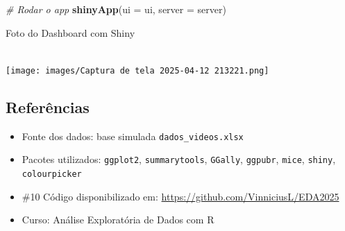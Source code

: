 \documentclass[
]{article}
\newenvironment{Shaded}{\begin{snugshade}}{\end{snugshade}}
\newcommand{\AttributeTok}[1]{\textcolor[rgb]{0.13,0.29,0.53}{#1}}
\newcommand{\CommentTok}[1]{\textcolor[rgb]{0.56,0.35,0.01}{\textit{#1}}}
\newcommand{\FunctionTok}[1]{\textcolor[rgb]{0.13,0.29,0.53}{\textbf{#1}}}
\newcommand{\NormalTok}[1]{#1}
\providecommand{\tightlist}{%
  \setlength{\itemsep}{0pt}\setlength{\parskip}{0pt}}
\begin{document}
\begin{Shaded}
\begin{Highlighting}[]
\CommentTok{\# Rodar o app}
\FunctionTok{shinyApp}\NormalTok{(}\AttributeTok{ui =}\NormalTok{ ui, }\AttributeTok{server =}\NormalTok{ server)}
\end{Highlighting}
\end{Shaded}

Foto do Dashboard com Shiny\\
\strut \\
\texttt{[image: images/Captura de tela 2025-04-12 213221.png]}

\subsection{Referências}\label{referuxeancias}

\begin{itemize}
\tightlist
\item
  Fonte dos dados: base simulada \texttt{dados\_videos.xlsx}
\item
  Pacotes utilizados: \texttt{ggplot2}, \texttt{summarytools},
  \texttt{GGally}, \texttt{ggpubr}, \texttt{mice}, \texttt{shiny},
  \texttt{colourpicker}
\item
  \#10 Código disponibilizado em:
  \url{https://github.com/VinniciusL/EDA2025}
\item
  Curso: Análise Exploratória de Dados com R
\end{itemize}
\end{document}
